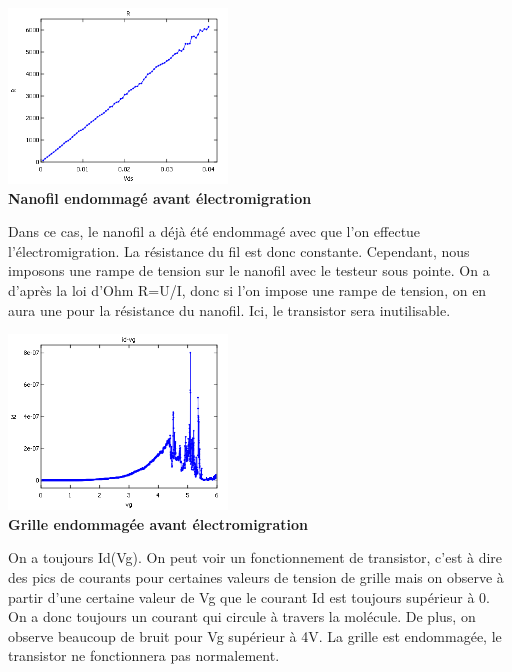 \begin{center}
    \includegraphics[width=220px]{Images/Nanofil_Emdommage.png}\\
    \textbf{Nanofil endommagé avant électromigration}
\end{center}
Dans ce cas, le nanofil a déjà été endommagé avec que l'on effectue l'électromigration. La résistance du fil est donc constante. Cependant, nous imposons une rampe de tension sur le nanofil avec le testeur sous pointe. On a d'après la loi d'Ohm R=U/I, donc si l'on impose une rampe de tension, on en aura une pour la résistance du nanofil. Ici, le transistor sera inutilisable.\\


\begin{center}
    \includegraphics[width=220px]{Images/Grille_Endommagee.png}\\
    \textbf{Grille endommagée avant électromigration}
\end{center}
On a toujours Id(Vg). On peut voir un fonctionnement de transistor, c'est à dire des pics de courants pour certaines valeurs de tension de grille mais on observe à partir d'une certaine valeur de Vg que le courant Id est toujours supérieur à 0. On a donc toujours un courant qui circule à travers la molécule. De plus, on observe beaucoup de bruit pour Vg supérieur à 4V. La grille est endommagée, le transistor ne fonctionnera pas normalement.\\

